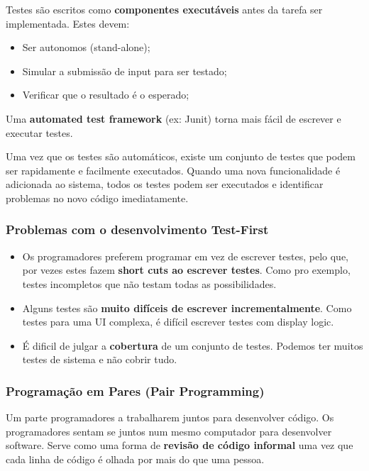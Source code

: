\documentclass{article}
\begin{document}
Testes são escritos como \textbf{componentes executáveis} antes da
tarefa ser implementada. Estes devem:
\begin{itemize}
  \item Ser autonomos (stand-alone);
  \item Simular a submissão de input para ser testado;
  \item Verificar que o resultado é o esperado;
\end{itemize}

Uma \textbf{automated test framework} (ex: Junit) torna mais fácil
de escrever e executar testes.

\vspace{2mm}

Uma vez que os testes são automáticos, existe um conjunto de testes
que podem ser rapidamente e facilmente executados. Quando uma nova
funcionalidade é adicionada ao sistema, todos os testes podem ser executados
e identificar problemas no novo código imediatamente.

\subsubsection{Problemas com o desenvolvimento Test-First}

\begin{itemize}
  \item Os programadores preferem programar em vez de escrever testes,
  pelo que, por vezes estes fazem \textbf{short cuts ao escrever testes}.
  Como pro exemplo, testes incompletos que não testam todas as possibilidades.

  \item Alguns testes são \textbf{muito difíceis de escrever incrementalmente}.
  Como testes para uma UI complexa, é difícil escrever testes com display logic.

  \item É dificil de julgar a \textbf{cobertura} de um conjunto de testes.
  Podemos ter muitos testes de sistema e não cobrir tudo.
\end{itemize}

\pagebreak

\subsubsection{Programação em Pares (Pair Programming)}

Um parte programadores a trabalharem juntos para desenvolver código.
Os programadores sentam se juntos num mesmo computador para desenvolver
software. Serve como uma forma de \textbf{revisão de código informal}
uma vez que cada linha de código é olhada por mais do que uma pessoa.
\end{document}
